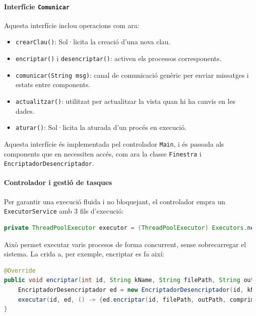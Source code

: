 \documentclass{ieeetj}
\begin{document}
\paragraph{Interfície \texttt{Comunicar}}

Aquesta interfície inclou operacions com ara:

\begin{itemize}
  \item \texttt{crearClau()}: Sol·licita la creació d'una nova clau.
  \item \texttt{encriptar()} i \texttt{desencriptar()}: activen els processos corresponents.
  \item \texttt{comunicar(String msg)}: canal de comunicació genèric per enviar missatges i estats entre components.
  \item \texttt{actualitzar()}: utilitzat per actualitzar la vista quan hi ha canvis en les dades.
  \item \texttt{aturar()}: Sol·licita la aturada d'un procés en execució.

\end{itemize}

Aquesta interfície és implementada pel controlador \texttt{Main}, i és passada als components que en necessiten accés, com ara la classe \texttt{Finestra} i \texttt{EncriptadorDesencriptador}.

\paragraph{Controlador i gestió de tasques}

Per garantir una execució fluida i no bloquejant, el controlador empra un \texttt{ExecutorService} amb 3 fils d'execució:

\begin{lstlisting}[language=Java]
private ThreadPoolExecutor executor = (ThreadPoolExecutor) Executors.newFixedThreadPool(3);
\end{lstlisting}

Això permet executar varis procesos de forma concurrent, sense sobrecarregar el sistema.
La crida a, per exemple, encriptar es fa així:

\begin{lstlisting}[language=Java]
@Override
public void encriptar(int id, String kName, String filePath, String outPath, boolean comprimir) {
    EncriptadorDesencriptador ed = new EncriptadorDesencriptador(id, kName);
    executar(id, ed, () -> {ed.encriptar(id, filePath, outPath, comprimir);});
}
\end{lstlisting}
\end{document}
